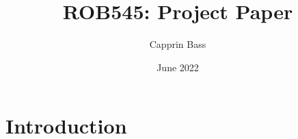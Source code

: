 \documentclass{article}
\title{ROB545: Project Paper}
\author{Capprin Bass}
\date{June 2022}
\begin{document}
\maketitle

\section{Introduction}
\end{document}
